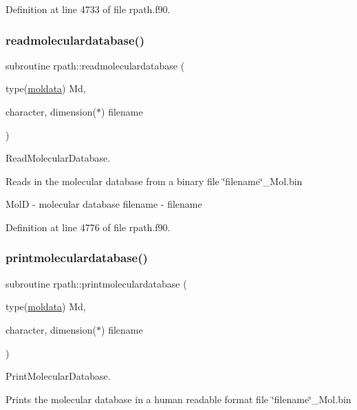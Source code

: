 Definition at line 4733 of file rpath.\+f90.

\mbox{\label{namespacerpath_a296f9413787464666a45c1433ea90a32}} 
\subsubsection{\texorpdfstring{readmoleculardatabase()}{readmoleculardatabase()}}
{\footnotesize\ttfamily subroutine rpath\+::readmoleculardatabase (\begin{DoxyParamCaption}\item[{type(\mbox{\hyperlink{structglobaldata_1_1moldata}{moldata}})}]{Md,  }\item[{character, dimension($\ast$)}]{filename }\end{DoxyParamCaption})}



Read\+Molecular\+Database. 

Reads in the molecular database from a binary file \char`\"{}filename\char`\"{}\+\_\+\+Mol.\+bin

MolD -\/ molecular database filename -\/ filename 

Definition at line 4776 of file rpath.\+f90.

\mbox{\label{namespacerpath_a1163d0179108c7da7f7b0590d9a5b911}} 
\subsubsection{\texorpdfstring{printmoleculardatabase()}{printmoleculardatabase()}}
{\footnotesize\ttfamily subroutine rpath\+::printmoleculardatabase (\begin{DoxyParamCaption}\item[{type(\mbox{\hyperlink{structglobaldata_1_1moldata}{moldata}})}]{Md,  }\item[{character, dimension($\ast$)}]{filename }\end{DoxyParamCaption})}



Print\+Molecular\+Database. 

Prints the molecular database in a human readable format file \char`\"{}filename\char`\"{}\+\_\+\+Mol.\+bin

